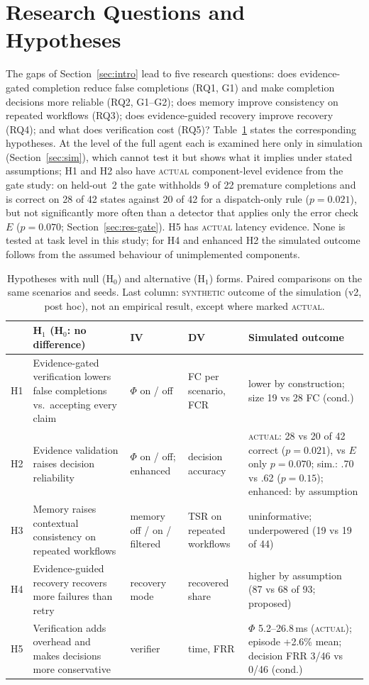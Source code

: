 \section{Research Questions and Hypotheses}
\label{sec:hypotheses}

The gaps of Section~\ref{sec:intro} lead to five research questions: does evidence-gated completion reduce false completions (RQ1, G1) and make completion decisions more reliable (RQ2, G1--G2); does memory improve consistency on repeated workflows (RQ3); does evidence-guided recovery improve recovery (RQ4); and what does verification cost (RQ5)? Table~\ref{tab:hyp} states the corresponding hypotheses. At the level of the full agent each is examined here only in simulation (Section~\ref{sec:sim}), which cannot test it but shows what it implies under stated assumptions; H1 and H2 also have \textsc{actual} component-level evidence from the gate study: on held-out~2 the gate withholds 9 of 22 premature completions and is correct on 28 of 42 states against 20 of 42 for a dispatch-only rule ($p=0.021$), but not significantly more often than a detector that applies only the error check $E$ ($p=0.070$; Section~\ref{sec:res-gate}). H5 has \textsc{actual} latency evidence. None is tested at task level in this study; for H4 and enhanced H2 the simulated outcome follows from the assumed behaviour of unimplemented components.

\begin{table}[t]
\centering
\caption{Hypotheses with null (H$_0$) and alternative (H$_1$) forms. Paired comparisons on the same scenarios and seeds. Last column: \textsc{synthetic} outcome of the simulation (v2, post hoc), not an empirical result, except where marked \textsc{actual}.}
\label{tab:hyp}
\scriptsize
\setlength{\tabcolsep}{1.6pt}
\begin{tabular}{@{}lp{2.85cm}p{1.75cm}p{1.45cm}p{1.9cm}@{}}
\toprule
 & H$_1$ (H$_0$: no difference) & IV & DV & Simulated outcome \\
\midrule
H1 & Evidence-gated verification lowers false completions vs.\ accepting every claim & $\Phi$ on / off & FC per scenario, FCR & lower by construction; size 19 vs 28 FC (cond.) \\
H2 & Evidence validation raises decision reliability & $\Phi$ on / off; enhanced & decision accuracy & \textsc{actual}: 28 vs 20 of 42 correct ($p{=}0.021$), vs $E$ only $p{=}0.070$; sim.: .70 vs .62 ($p{=}0.15$); enhanced: by assumption \\
H3 & Memory raises contextual consistency on repeated workflows & memory off / on / filtered & TSR on repeated workflows & uninformative; underpowered (19 vs 19 of 44) \\
H4 & Evidence-guided recovery recovers more failures than retry & recovery mode & recovered share & higher by assumption (87 vs 68 of 93; proposed) \\
H5 & Verification adds overhead and makes decisions more conservative & verifier & time, FRR & $\Phi$ 5.2--26.8\,ms (\textsc{actual}); episode +2.6\% mean; decision FRR 3/46 vs 0/46 (cond.) \\
\bottomrule
\end{tabular}
\end{table}
